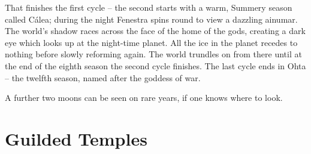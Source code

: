 \begin{multicols}{2}
That finishes the first cycle -- the second starts with a warm, Summery season called C\'{a}lea; during the night Fenestra spins round to view a dazzling \gls{ainumar}.
The world's shadow races across the face of the home of the gods, creating a dark eye which looks up at the night-time planet.
All the ice in the planet recedes to nothing before slowly reforming again.
The world trundles on from there until at the end of the eighth season the second cycle finishes.
The last cycle ends in Ohta -- the twelfth season, named after the goddess of war.

A further two moons can be seen on rare years, if one knows where to look.

\end{multicols}

\section{Guilded Temples}

